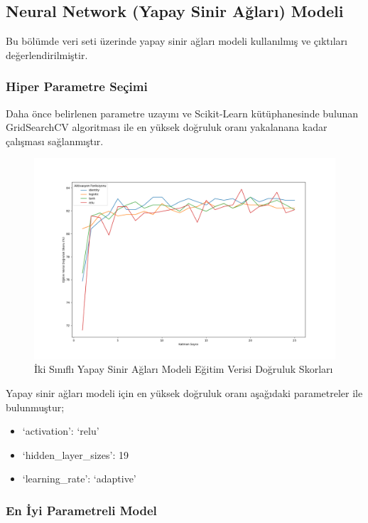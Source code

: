 \documentclass[12pt,twoside]{deuthesis}
\providecommand{\tightlist}{%
  \setlength{\itemsep}{0pt}\setlength{\parskip}{0pt}}
\begin{document}
\hypertarget{bin_nn}{%
\subsection{Neural Network (Yapay Sinir Ağları) Modeli}\label{bin_nn}}

Bu bölümde veri seti üzerinde yapay sinir ağları modeli kullanılmış ve çıktıları değerlendirilmiştir.

\hypertarget{hiper-parametre-seuxe7imi-7}{%
\subsubsection{Hiper Parametre Seçimi}\label{hiper-parametre-seuxe7imi-7}}

Daha önce belirlenen parametre uzayını ve Scikit-Learn kütüphanesinde bulunan GridSearchCV algoritması ile en yüksek doğruluk oranı yakalanana kadar çalışması sağlanmıştır.
\begin{figure}

{\centering \includegraphics[width=1.1\linewidth,height=0.55\textheight]{figure/NN_bin_Grid_Graph} 

}

\caption{İki Sınıflı Yapay Sinir Ağları Modeli Eğitim Verisi Doğruluk Skorları}\label{fig:unnamed-chunk-78}
\end{figure}
Yapay sinir ağları modeli için en yüksek doğruluk oranı aşağıdaki parametreler ile bulunmuştur;
\begin{itemize}
\tightlist
\item
  `activation': `relu'\\
\item
  `hidden\_layer\_sizes': 19\\
\item
  `learning\_rate': `adaptive'\\
  \newpage  
\end{itemize}
\hypertarget{en-iyi-parametreli-model-5}{%
\subsubsection{En İyi Parametreli Model}\label{en-iyi-parametreli-model-5}}
\end{document}
